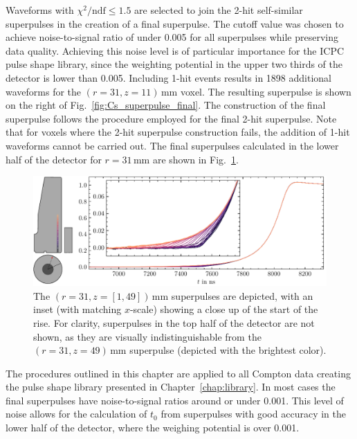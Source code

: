 Waveforms with $\chi^2/\text{ndf} \le 1.5$ are selected to join the 2-hit self-similar superpulses in the creation of a final superpulse. The cutoff value was chosen to achieve noise-to-signal ratio of under 0.005 for all superpulses while preserving data quality. Achieving this noise level is of particular importance for the ICPC pulse shape library, since the weighting potential in the upper two thirds of the detector is lower than 0.005. Including 1-hit events results in 1898 additional waveforms for the $(r = 31, z = 11)$\,mm voxel. The resulting superpulse is shown on the right of Fig.~\ref{fig:Cs_superpulse_final}. The construction of the final superpulse follows the procedure employed for the final 2-hit superpulse. Note that for voxels where the 2-hit superpulse construction fails, the addition of 1-hit waveforms cannot be carried out. The final superpulses calculated in the lower half of the detector for $r = 31$\,mm are shown in Fig.~\ref{fig:Cs_superpulse_all_z}.
\begin{figure}[htb]
    \centering
    \includegraphics[width=6in]{figs/pipeline/Cs_superpulse_all_z.pdf}
    \caption{The $(r = 31, z = [1,49])$\,mm superpulses are depicted, with an inset (with matching $x$-scale) showing a close up of the start of the rise. For clarity, superpulses in the top half of the detector are not shown, as they are visually indistinguishable from the $(r = 31, z = 49)$\,mm superpulse (depicted with the brightest color).}
    \label{fig:Cs_superpulse_all_z}
\end{figure}

The procedures outlined in this chapter are applied to all Compton data creating the pulse shape library presented in Chapter~\ref{chap:library}. In most cases the final superpulses have noise-to-signal ratios around or under 0.001. This level of noise allows for the calculation of $t_0$ from superpulses with good accuracy in the lower half of the detector, where the weighing potential is over 0.001.